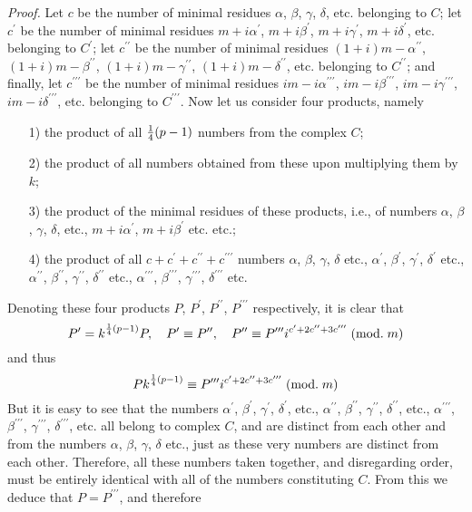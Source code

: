 \documentclass[twoside,12pt]{memoir}
\renewcommand{\pmod}[1]{\;(\textrm{mod.}\;#1)}
\let\oldfrac\frac
\def\frac#1#2{\mathchoice{\tfrac{#1}{#2}}{\oldfrac{#1}{#2}}{\genfrac{}{}{}{2}{#1}{#2\mathstrut}}{\genfrac{}{}{}{3}{#1}{#2\mathstrut}}}
\begin{document}
\textit{Proof.} Let \(c\) be the number of minimal residues \(\alpha\), \(\beta\), \(\gamma\), \(\delta\), etc{.} belonging to \(C\); let \(c^{\prime}\) be the number of minimal residues \(m+i \alpha^{\prime}\), \(m+i \beta^{\prime}\), \(m+i \gamma^{\prime}\), \(m+i \delta^{\prime}\), etc{.} belonging to \(C^{\prime}\); let \(c^{\prime \prime}\) be the number of minimal residues \((1+i) m-\alpha^{\prime \prime}\), \((1+i) m-\beta^{\prime \prime}\), \((1+i) m-\gamma^{\prime \prime}\), \((1+i) m-\delta^{\prime \prime}\), etc{.} belonging to \(C^{\prime \prime}\); and finally, let \(c^{\prime \prime \prime}\) be the number of minimal residues \(i m-i \alpha^{\prime \prime \prime}\), \(i m-i \beta^{\prime \prime \prime}\), \(i m-i \gamma^{\prime \prime \prime}\), \(i m-i \delta^{\prime \prime \prime}\), etc{.} belonging to \(C^{\prime \prime \prime}\). Now let us consider four products, namely
\begin{enumerate}
\item[1)] the product of all \(\frac{1}{4}(p-1)\) numbers from the complex \(C\);
\item[2)] the product of all numbers obtained from these upon multiplying them by \(k\);
\item[3)] the product of the minimal residues of these products, i{.}e{.}, of numbers \(\alpha\), \(\beta\), \(\gamma\), \(\delta\), etc{.}, \(m+i \alpha^{\prime}\), \(m+i \beta^{\prime}\) etc{.} etc{.};
\item[4)] the product of all \(c+c^{\prime}+c^{\prime \prime}+c^{\prime \prime \prime}\) numbers \(\alpha\), \(\beta\), \(\gamma\), \(\delta\) etc{.}, \(\alpha^{\prime}\), \(\beta^{\prime}\), \(\gamma^{\prime}\), \(\delta^{\prime}\) etc{.}, \(\alpha^{\prime \prime}\), \(\beta^{\prime \prime}\), \(\gamma^{\prime \prime}\), \(\delta^{\prime \prime}\) etc{.}, \(\alpha^{\prime \prime \prime}\), \(\beta^{\prime \prime \prime}\), \(\gamma^{\prime \prime \prime}\), \(\delta^{\prime \prime \prime}\) etc{.}
\end{enumerate}
Denoting these four products \(P\), \(P^{\prime} \), \(P^{\prime \prime}\), \(P^{\prime \prime \prime}\) respectively, it is clear that
\[P^{\prime}=k^{\frac{1}{4}(p-1)} P, \quad P^{\prime} \equiv P^{\prime \prime}, \quad P^{\prime \prime} \equiv P^{\prime \prime \prime} i^{c^{\prime}+2 c^{\prime \prime}+3 c^{\prime \prime \prime}}\pmod{m}\]
and thus
\[P k^{\frac{1}{4}(p-1)} \equiv P^{\prime \prime \prime} i^{c^{\prime}+2 c^{\prime \prime}+3 c^{\prime \prime \prime}}\pmod{m}\]
But it is easy to see that the numbers \(\alpha^{\prime}\), \(\beta^{\prime}\), \(\gamma^{\prime}\), \(\delta^{\prime}\), etc{.}, \(\alpha^{\prime \prime}\), \(\beta^{\prime \prime}\), \(\gamma^{\prime \prime}\), \(\delta^{\prime \prime}\), etc{.}, \(\alpha^{\prime \prime \prime}\), \(\beta^{\prime \prime \prime}\), \(\gamma^{\prime \prime \prime}\), \(\delta^{\prime \prime \prime}\), etc{.} all belong to complex \(C\), and are distinct from each other and from the numbers \(\alpha\), \(\beta\), \(\gamma\), \(\delta\) etc{.}, just as these very numbers are distinct from each other. Therefore, all these numbers taken together, and disregarding order, must be entirely identical with all of the numbers constituting \(C\).  From this we deduce that \(P=P^{\prime \prime \prime}\), and therefore
\end{document}
